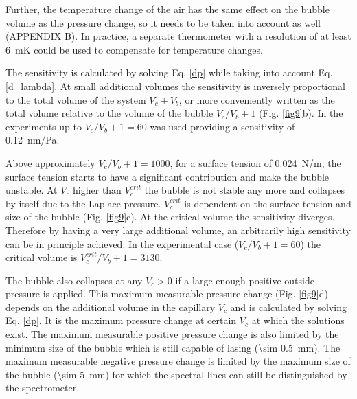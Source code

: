 \documentclass[a4paper,12pt]{article}
\begin{document}
    Further, the temperature change of the air has the same effect on the bubble volume as the pressure change, so it needs to be taken into account as well (APPENDIX B). In practice, a separate thermometer with a resolution of at least \SI{6}{mK} could be used to compensate for temperature changes.
 
 
    The sensitivity is calculated by solving Eq. \eqref{dp} while taking into account Eq. \eqref{d_lambda}. At small additional volumes the sensitivity is inversely proportional to the total volume of the system  $V_c+V_b$, or more conveniently written as the total volume relative to the volume of the bubble $V_c/V_b+1$ (Fig. \ref{fig9}b). In the experiments up to $V_c/V_b+1=60$ was used providing a sensitivity of \SI{0.12}{nm/Pa}.
	
	Above approximately $V_c/V_b+1=1000$, for a surface tension of \SI{0.024}{N/m}, the surface tension starts to have a significant contribution and make the bubble unstable. At $V_c$ higher than $V_c^{crit}$ the bubble is not stable any more and collapses by itself due to the Laplace pressure. $V_c^{crit}$ is dependent on the surface tension and size of the bubble (Fig. \ref{fig9}c). At the critical volume the sensitivity diverges. Therefore by having a very large additional volume, an arbitrarily high sensitivity can be in principle achieved. In the experimental case ($V_c/V_b+1=60$) the critical volume is $V_c^{crit}/V_b+1=3130$.
	
	The bubble also collapses at any $V_c>0$ if a large enough positive outside pressure is applied. This maximum measurable pressure change (Fig. \ref{fig9}d) depends on the additional volume in the capillary $V_c$ and is calculated by solving Eq. \eqref{dp}. It is the maximum pressure change at certain $V_c$ at which the solutions exist. The maximum measurable positive pressure change is also limited by the minimum size of the bubble which is still capable of lasing (\SI{\sim 0.5}{mm}). The maximum measurable negative pressure change is limited by the maximum size of the bubble (\SI{\sim 5}{mm}) for which the spectral lines can still be distinguished by the spectrometer. 
	
\end{document}
